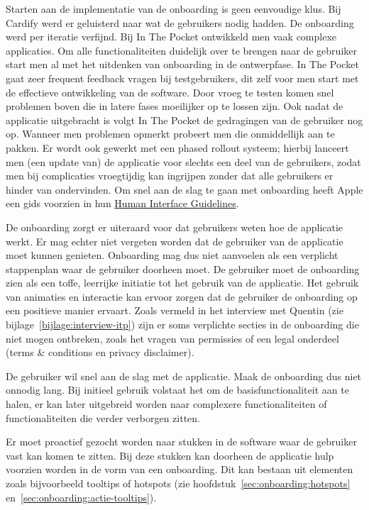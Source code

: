 Starten aan de implementatie van de onboarding is geen eenvoudige klus. Bij Cardify werd er geluisterd naar wat de gebruikers nodig hadden. De onboarding werd per iteratie verfijnd. Bij In The Pocket ontwikkeld men vaak complexe applicaties. Om alle functionaliteiten duidelijk over te brengen naar de gebruiker start men al met het uitdenken van onboarding in de ontwerpfase. In The Pocket gaat zeer frequent feedback vragen bij testgebruikers, dit zelf voor men start met de effectieve ontwikkeling van de software. Door vroeg te testen komen snel problemen boven die in latere fases moeilijker op te lossen zijn. Ook nadat de applicatie uitgebracht is volgt In The Pocket de gedragingen van de gebruiker nog op. Wanneer men problemen opmerkt probeert men die onmiddellijk aan te pakken. Er wordt ook gewerkt met een phased rollout systeem; hierbij lanceert men (een update van) de applicatie voor slechts een deel van de gebruikers, zodat men bij complicaties vroegtijdig kan ingrijpen zonder dat alle gebruikers er hinder van ondervinden. Om snel aan de slag te gaan met onboarding heeft Apple een gids voorzien in hun \href{https://developer.apple.com/design/human-interface-guidelines/ios/app-architecture/onboarding/}{Human Interface Guidelines}.

De onboarding zorgt er uiteraard voor dat gebruikers weten hoe de applicatie werkt. Er mag echter niet vergeten worden dat de gebruiker van de applicatie moet kunnen genieten. Onboarding mag dus niet aanvoelen als een verplicht stappenplan waar de gebruiker doorheen moet. De gebruiker moet de onboarding zien als een toffe, leerrijke initiatie tot het gebruik van de applicatie. Het gebruik van animaties en interactie kan ervoor zorgen dat de gebruiker de onboarding op een positieve manier ervaart. Zoals vermeld in het interview met Quentin (zie bijlage~\ref{bijlage:interview-itp}) zijn er soms verplichte secties in de onboarding die niet mogen ontbreken, zoals het vragen van permissies of een legal onderdeel (terms \& conditions en privacy disclaimer).

De gebruiker wil snel aan de slag met de applicatie. Maak de onboarding dus niet onnodig lang. Bij initieel gebruik volstaat het om de basisfunctionaliteit aan te halen, er kan later uitgebreid worden naar complexere functionaliteiten of functionaliteiten die verder verborgen zitten.

Er moet proactief gezocht worden naar stukken in de software waar de gebruiker vast kan komen te zitten. Bij deze stukken kan doorheen de applicatie hulp voorzien worden in de vorm van een onboarding. Dit kan bestaan uit elementen zoals bijvoorbeeld tooltips of hotspots (zie hoofdstuk~\ref{sec:onboarding:hotspots} en~\ref{sec:onboarding:actie-tooltips}).

